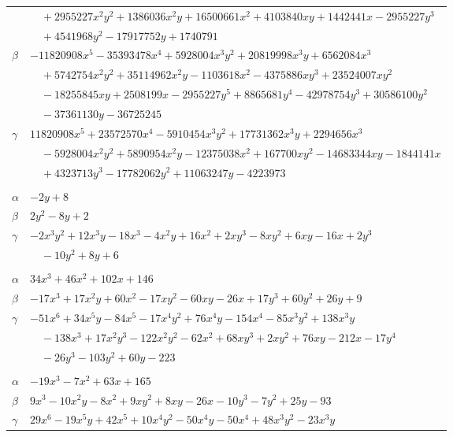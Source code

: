\documentclass[11pt]{article}
\begin{document}
\begin{longtable}{@{}ll@{}}
 & $\quad +2955227x^{2}y^{2}+1386036x^{2}y+16500661x^{2}+4103840xy+1442441x-2955227y^{3}$\\
 & $\quad +4541968y^{2}-17917752y+1740791$\\
$\beta$ & $-11820908x^{5}-35393478x^{4}+5928004x^{3}y^{2}+20819998x^{3}y+6562084x^{3}$\\
 & $\quad +5742754x^{2}y^{2}+35114962x^{2}y-1103618x^{2}-4375886xy^{3}+23524007xy^{2}$\\
 & $\quad -18255845xy+2508199x-2955227y^{5}+8865681y^{4}-42978754y^{3}+30586100y^{2}$\\
 & $\quad -37361130y-36725245$\\
$\gamma$ & $11820908x^{5}+23572570x^{4}-5910454x^{3}y^{2}+17731362x^{3}y+2294656x^{3}$\\
 & $\quad -5928004x^{2}y^{2}+5890954x^{2}y-12375038x^{2}+167700xy^{2}-14683344xy-1844141x$\\
 & $\quad +4323713y^{3}-17782062y^{2}+11063247y-4223973$\\
\addlinespace[3pt]
\multicolumn{2}{@{}l}{$\{i,j\}=\{26,41\}$, $k_{ij}=2^{5}$}\\
$\alpha$ & $-2y+8$\\
$\beta$ & $2y^{2}-8y+2$\\
$\gamma$ & $-2x^{3}y^{2}+12x^{3}y-18x^{3}-4x^{2}y+16x^{2}+2xy^{3}-8xy^{2}+6xy-16x+2y^{3}$\\
 & $\quad -10y^{2}+8y+6$\\
\addlinespace[3pt]
\multicolumn{2}{@{}l}{$\{i,j\}=\{26,45\}$, $k_{ij}=2^{5}\cdot 7$}\\
$\alpha$ & $34x^{3}+46x^{2}+102x+146$\\
$\beta$ & $-17x^{3}+17x^{2}y+60x^{2}-17xy^{2}-60xy-26x+17y^{3}+60y^{2}+26y+9$\\
$\gamma$ & $-51x^{6}+34x^{5}y-84x^{5}-17x^{4}y^{2}+76x^{4}y-154x^{4}-85x^{3}y^{2}+138x^{3}y$\\
 & $\quad -138x^{3}+17x^{2}y^{3}-122x^{2}y^{2}-62x^{2}+68xy^{3}+2xy^{2}+76xy-212x-17y^{4}$\\
 & $\quad -26y^{3}-103y^{2}+60y-223$\\
\addlinespace[3pt]
\multicolumn{2}{@{}l}{$\{i,j\}=\{26,46\}$, $k_{ij}=2^{2}\cdot 5\cdot 37$}\\
$\alpha$ & $-19x^{3}-7x^{2}+63x+165$\\
$\beta$ & $9x^{3}-10x^{2}y-8x^{2}+9xy^{2}+8xy-26x-10y^{3}-7y^{2}+25y-93$\\
$\gamma$ & $29x^{6}-19x^{5}y+42x^{5}+10x^{4}y^{2}-50x^{4}y-50x^{4}+48x^{3}y^{2}-23x^{3}y$\\

\end{longtable}
\end{document}
